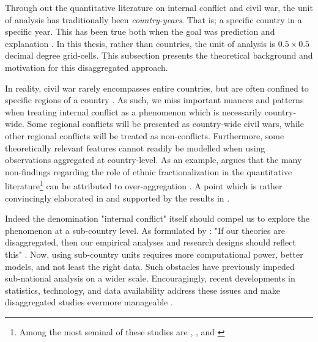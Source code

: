 \documentclass[a4paper]{article}
\begin{document}

Through out the quantitative literature on internal conflict and civil war, the unit of analysis has traditionally been \emph{country-years}. That is; a specific country in a specific year. This has been true both when the goal was prediction \citep{Goldstone_2010, mueller_2016} and explanation \citep{Collier_Hoeffler_1998, Fearon_Laitin_2003, Collier_Hoeffler_2004, Hegre_Sambanis_2006}. In this thesis, rather than countries, the unit of analysis is $0.5\times0.5$ decimal degree grid-cells. This subsection presents the theoretical background and motivation for this disaggregated approach.\par

In reality, civil war rarely encompasses entire countries, but are often confined to specific regions of a country \cite[487]{Cederman_Gleditsch_2009}. As such, we miss important nuances and patterns when treating internal conflict as a phenomenon which is necessarily country-wide. Some regional conflicts will be presented as country-wide civil wars, while other regional conflicts will be treated as non-conflicts. Furthermore, some theoretically relevant features cannot readily be modelled when using observations aggregated at country-level. As an example, \cite{Cederman_Gleditsch_2009} argues that the many non-findings regarding the role of ethnic fractionalization in the quantitative literature\footnote{Among the most seminal of these studies are \cite{Fearon_Laitin_2003}, \cite{Collier_Hoeffler_2004}, and \cite{Hegre_Sambanis_2006}} can be attributed to over-aggregation \citep[493]{Cederman_Gleditsch_2009}. A point which is rather convincingly elaborated in \cite{Cederman_Gleditsch_Buhaug_2013} and supported by the results in \cite{Goldstone_2010}. 

Indeed the denomination "internal conflict" itself should compel us to explore the phenomenon at a sub-country level. As formulated by \cite{Cederman_Gleditsch_2009}: "If our theories are disaggregated, then our empirical analyses and research designs should reflect this" \citep[490]{Cederman_Gleditsch_2009}. Now, using sub-country units requires more computational power, better models, and not least the right data. Such obstacles have previously impeded sub-national analysis on a wider scale. Encouragingly, recent developments in statistics, technology, and data availability address these issues and make disaggregated studies evermore manageable \citep[446]{ol2010afghanistan}.\par
\end{document}
